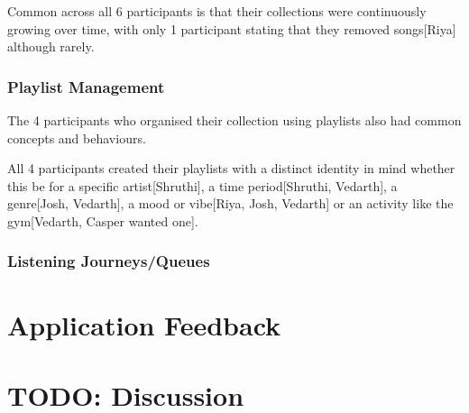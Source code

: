 Common across all 6 participants is that their collections were continuously growing over time, with only 1 participant stating that they removed songs[Riya] although rarely. %

\subsubsection{Playlist Management}
The 4 participants who organised their collection using playlists also had common concepts and behaviours.

All 4 participants created their playlists with a distinct identity in mind whether this be for a specific artist[Shruthi], a time period[Shruthi, Vedarth], a genre[Josh, Vedarth], a mood or vibe[Riya, Josh, Vedarth] or an activity like the gym[Vedarth, Casper wanted one].



\subsubsection{Listening Journeys/Queues}

\section{Application Feedback}

\section{TODO: Discussion}